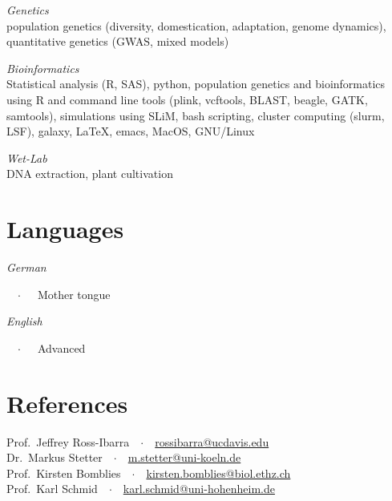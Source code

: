 \documentclass[margin,10pt,a4paper]{res}
\begin{document}
\begin{resume}
{\sl{Genetics}}\\
population genetics (diversity, domestication, adaptation, genome dynamics), quantitative genetics (GWAS, mixed models)
 
{\sl{Bioinformatics}}\\
Statistical analysis (\textsf{R}, \textsc{SAS}), python, population genetics and bioinformatics using \textsf{R} and command line tools (plink, vcftools, BLAST, beagle, GATK, samtools), simulations using SLiM, bash scripting, cluster computing (slurm, LSF), galaxy, \LaTeX, emacs, MacOS, GNU/Linux

{\sl{Wet-Lab}}\\
DNA extraction, plant cultivation


\section{Languages}
\newlength{\langbox} 
\settowidth{\langbox}{Germang}
\parbox[t]{\langbox}{\sl{German}}\ \ $\cdotp$\ \ \ Mother tongue\\
\parbox[t]{\langbox}{\sl{English}}\ \ $\cdotp$\ \ \ Advanced


\section{References}

Prof.~Jeffrey Ross-Ibarra\ \ $\cdotp$\ \ \href{mailto:rossibarra@ucdavis.edu}{rossibarra@ucdavis.edu}\\
Dr.~Markus Stetter\ \ $\cdotp$\ \ \href{mailto:m.stetter@uni-koeln.de}{m.stetter@uni-koeln.de}\\
Prof.~Kirsten Bomblies\ \ $\cdotp$\ \ \href{mailto:kirsten.bomblies@biol.ethz.ch}{kirsten.bomblies@biol.ethz.ch}\\
Prof.~Karl Schmid\ \ $\cdotp$\ \ \href{mailto:karl.schmid@uni-hohenheim.de}{karl.schmid@uni-hohenheim.de}\\



\end{resume}
\end{document}
